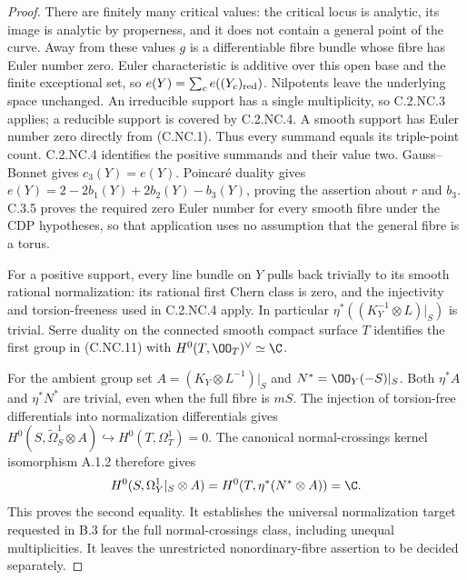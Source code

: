 \begin{proof}
There are finitely many critical values: the critical locus is analytic, its image is analytic by properness, and it does not contain a general point of the curve. Away from these values $g$ is a differentiable fibre bundle whose fibre has Euler number zero. Euler characteristic is additive over this open base and the finite exceptional set, so $e(Y)=\sum_c e((Y_c)_{\rm red})$. Nilpotents leave the underlying space unchanged. An irreducible support has a single multiplicity, so C.2.NC.3 applies; a reducible support is covered by C.2.NC.4. A smooth support has Euler number zero directly from (C.NC.1). Thus every summand equals its triple-point count. C.2.NC.4 identifies the positive summands and their value two. Gauss--Bonnet gives $c_3(Y)=e(Y)$. Poincaré duality gives $e(Y)=2-2b_1(Y)+2b_2(Y)-b_3(Y)$, proving the assertion about $r$ and $b_3$. C.3.5 proves the required zero Euler number for every smooth fibre under the CDP hypotheses, so that application uses no assumption that the general fibre is a torus.

For a positive support, every line bundle on $Y$ pulls back trivially to its smooth rational normalization: its rational first Chern class is zero, and the injectivity and torsion-freeness used in C.2.NC.4 apply. In particular $\eta^*((K_Y^{-1}\otimes L)|_S)$ is trivial. Serre duality on the connected smooth compact surface $T$ identifies the first group in (C.NC.11) with $H^0(T,\OO_T)^\vee\simeq\C$.

For the ambient group set $A=(K_Y\otimes L^{-1})|_S$ and $N^*=\OO_Y(-S)|_S$. Both $\eta^*A$ and $\eta^*N^*$ are trivial, even when the full fibre is $mS$. The injection of torsion-free differentials into normalization differentials gives
$H^0(S,\widetilde\Omega_S^1\otimes A)\hookrightarrow H^0(T,\Omega_T^1)=0$.
The canonical normal-crossings kernel isomorphism A.1.2 therefore gives
\[
 H^0(S,\Omega_Y^1|_S\otimes A)
 =H^0(T,\eta^*(N^*\otimes A))=\C.
\]
This proves the second equality. It establishes the universal normalization target requested in B.3 for the full normal-crossings class, including unequal multiplicities. It leaves the unrestricted nonordinary-fibre assertion to be decided separately.
\end{proof}
